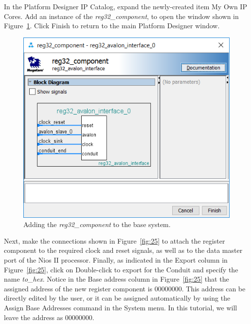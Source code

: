 \documentclass[11pt, twoside, pdftex]{article}
\begin{document}
In the Platform Designer IP Catalog, expand the newly-created item {\sf My Own IP Cores}. 
Add an instance of the {\it reg32\_component}, to open the window shown in
Figure~\ref{fig:24}. Click {\sf Finish} to return to the main Platform Designer window. 
\begin{figure}[h]
   \begin{center}
        \includegraphics[scale=0.60]{figures/figure24.png}
   \end{center}
   \caption{Adding the {\it reg32\_component} to the base system.}
	\label{fig:24}
\end{figure}

Next, make the connections shown in Figure~\ref{fig:25} to attach the register component to the required
clock and reset signals, as well as to the data master port of the Nios II processor.
Finally, as indicated in the {\sf Export} column in Figure~\ref{fig:25}, click on 
{\sf Double-click to export} for the {\sf Conduit} and specify the name {\it to\_hex}.
Notice in the {\sf Base} address column in Figure~\ref{fig:25} that the assigned address
of the new register component is 00000000. This address can be directly edited by the
user, or it can be assigned automatically by using the {\sf Assign Base Addresses} command in
the {\sf System} menu. In this tutorial, we will leave the address as 00000000.
\end{document}
